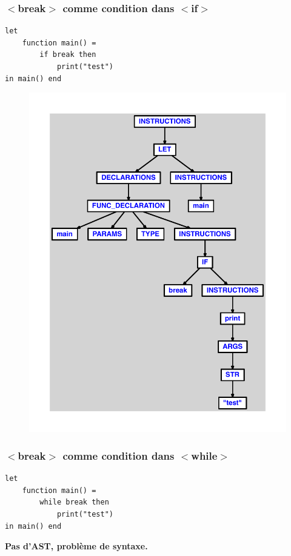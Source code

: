 \documentclass{article}
\begin{document}
\subsubsection{$ < $break$ > $ comme condition dans $ < $if$ > $}
\begin{lstlisting}
let
	function main() =
		if break then
			print("test")
in main() end
\end{lstlisting}
\newpage
\begin{figure}[H]
\centering
\includegraphics[max width=\textwidth]{ast/ast_7.pdf}
\end{figure}
\newpage
\subsubsection{$ < $break$ > $ comme condition dans $ < $while$ > $}
\begin{lstlisting}
let
	function main() =
		while break then
			print("test")
in main() end
\end{lstlisting}
\newpage
{\color{red}\textbf{Pas d'AST, problème de syntaxe.}}
\newpage
\end{document}
